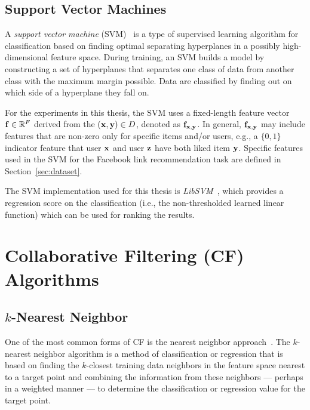 \subsection{Support Vector Machines}
\label{sec:svm}

A \emph{support vector machine} (SVM)~\cite{svms} is a type of supervised
learning algorithm for classification based on finding optimal separating
hyperplanes in a possibly high-dimensional feature space.  During
training, an SVM builds a model by constructing a set of hyperplanes
that separates one class of data from another class with the maximum
margin possible.  Data are classified by finding out on which side of
a hyperplane they fall on.

For the experiments in this thesis, the SVM uses a fixed-length
feature vector $\mathbf{f} \in \mathbb{R}^F$ derived from the $(\mathbf{x},\mathbf{y}) \in D$,
denoted as $\mathbf{f}_{\mathbf{x},\mathbf{y}}$.  
In general, $\mathbf{f}_{\mathbf{x},\mathbf{y}}$ may include features that are
non-zero only for specific items and/or users, e.g., a $\{0,1\}$
indicator feature that user $\mathbf{x}$ and user $\mathbf{z}$ have both liked item
$\mathbf{y}$.  Specific features used in the SVM for the Facebook link recommendation
task are defined in Section~\ref{sec:dataset}.

The SVM implementation used for this thesis is
\emph{LibSVM}~\cite{libsvm}, which provides a regression score on the
classification (i.e., the non-thresholded learned linear function) 
which can be used for ranking the results.

\section{Collaborative Filtering (CF) Algorithms}

\subsection{$k$-Nearest Neighbor}
\label{sec:nn}

One of the most common forms of CF is the nearest neighbor
approach~\cite{bellkor}. The $k$-nearest neighbor algorithm is a
method of classification or regression that is based on finding the $k$-closest
training data neighbors in the feature space nearest to a target point and combining the information from these neighbors --- perhaps
in a weighted manner --- to determine the classification or regression value
for the target point. 

